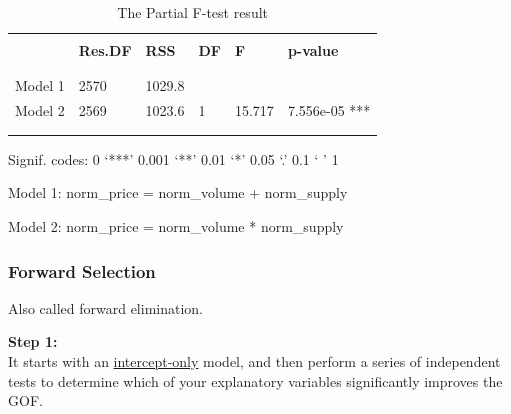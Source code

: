 \documentclass[12pt]{article}
\begin{document}
\begin{table}[h!]
\begin{center}
	
\begin{threeparttable}
		\caption{The Partial F-test result}			

\begin{tabular}{llllll}
\\ [-1.8ex]
\hline
\hline


\hline \\[-1.8ex]
 & {\textbf {Res.DF}} & {\textbf {RSS}} &{\textbf {DF}}&{\textbf {F}} & 
 {\textbf {p-value}}  \\
\\ [-1.8ex]
\hline \\[-1.8ex]


Model 1   &2570 &1029.8			&   &				&\\
Model 2   &2569 &1023.6     &1  &15.717 &7.556e-05 ***\\




\\ [-1.8ex]
\hline \\[-1.8ex]

\end{tabular}
\begin{tablenotes}
\small
\item Signif. codes:  0 ‘***’ 0.001 ‘**’ 0.01 ‘*’ 0.05 ‘.’ 0.1 ‘ ’ 1
\item Model 1: norm\_price = norm\_volume + norm\_supply
\item Model 2: norm\_price = norm\_volume * norm\_supply
\end{tablenotes}

\end{threeparttable}
\end{center}
\end{table}






\subsubsection{Forward Selection}


Also called forward elimination.

{\textbf {Step 1:}}\\
It starts with an {\underline {intercept-only}} model, and then
perform a series of independent tests to determine which of your 
explanatory variables significantly improves the GOF.
\end{document}
